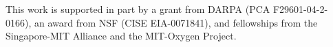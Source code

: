 This work is supported in part by a grant from DARPA (PCA F29601-04-2-0166), 
an award from NSF (CISE EIA-0071841), and fellowships from the
Singapore-MIT Alliance and the MIT-Oxygen Project.
%
%
% 

